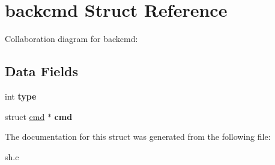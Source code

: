 \hypertarget{structbackcmd}{}\section{backcmd Struct Reference}
\label{structbackcmd}


Collaboration diagram for backcmd\+:
\subsection*{Data Fields}
\begin{DoxyCompactItemize}
\item 
\mbox{\label{structbackcmd_a38298e998fc63358cc59f1e0dcf85a38}} 
int {\bfseries type}
\item 
\mbox{\label{structbackcmd_a74a697014e2d3a17710e530fca0e8432}} 
struct \mbox{\hyperlink{structcmd}{cmd}} $\ast$ {\bfseries cmd}
\end{DoxyCompactItemize}


The documentation for this struct was generated from the following file\+:\begin{DoxyCompactItemize}
\item 
sh.\+c\end{DoxyCompactItemize}
